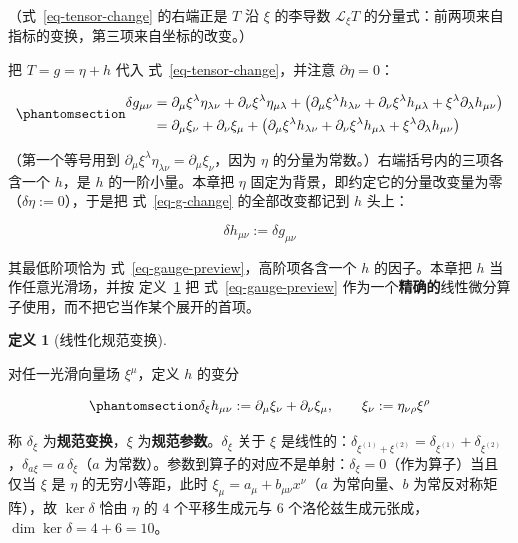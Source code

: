 \documentclass[
  chinese,
  a4paper,
  UTF8,
  12pt,
  oneside,
  openany]{ctexbook}
\theoremstyle{plain}
\theoremstyle{plain}
\theoremstyle{plain}
\theoremstyle{definition}
\newtheorem{definition}{定义}[chapter]
\theoremstyle{plain}
\theoremstyle{plain}
\theoremstyle{remark}
\begin{document}
（式~\ref{eq-tensor-change} 的右端正是 \(T\) 沿 \(\xi\) 的李导数
\(\mathcal{L}_{\xi}T\)
的分量式：前两项来自指标的变换，第三项来自坐标的改变。）

把 \(T=g=\eta+h\) 代入 式~\ref{eq-tensor-change}，并注意
\(\partial\eta=0\)：

\begin{equation}\protect\phantomsection\label{eq-g-change}{
\begin{aligned}
\delta g_{\mu\nu}
&=\partial_{\mu}\xi^{\lambda}\eta_{\lambda\nu}
+\partial_{\nu}\xi^{\lambda}\eta_{\mu\lambda}
+\bigl(\partial_{\mu}\xi^{\lambda}h_{\lambda\nu}
+\partial_{\nu}\xi^{\lambda}h_{\mu\lambda}
+\xi^{\lambda}\partial_{\lambda}h_{\mu\nu}\bigr)\\
&=\partial_{\mu}\xi_{\nu}+\partial_{\nu}\xi_{\mu}
+\bigl(\partial_{\mu}\xi^{\lambda}h_{\lambda\nu}
+\partial_{\nu}\xi^{\lambda}h_{\mu\lambda}
+\xi^{\lambda}\partial_{\lambda}h_{\mu\nu}\bigr)
\end{aligned}
}\end{equation}

（第一个等号用到
\(\partial_{\mu}\xi^{\lambda}\eta_{\lambda\nu}=\partial_{\mu}\xi_{\nu}\)，因为
\(\eta\) 的分量为常数。）右端括号内的三项各含一个 \(h\)，是 \(h\)
的一阶小量。本章把 \(\eta\)
固定为背景，即约定它的分量改变量为零（\(\delta\eta:=0\)），于是把
式~\ref{eq-g-change} 的全部改变都记到 \(h\) 头上：

\[
\delta h_{\mu\nu}:=\delta g_{\mu\nu}
\]

其最低阶项恰为 式~\ref{eq-gauge-preview}，高阶项各含一个 \(h\)
的因子。本章把 \(h\) 当作任意光滑场，并按 定义~\ref{def-linear-gauge} 把
式~\ref{eq-gauge-preview}
作为一个\textbf{精确的}线性微分算子使用，而不把它当作某个展开的首项。

\begin{definition}[线性化规范变换]\protect\hypertarget{def-linear-gauge}{}\label{def-linear-gauge}

对任一光滑向量场 \(\xi^{\mu}\)，定义 \(h\) 的变分

\begin{equation}\protect\phantomsection\label{eq-linear-gauge}{
\delta_{\xi}h_{\mu\nu} := \partial_{\mu}\xi_{\nu}+\partial_{\nu}\xi_{\mu},
\qquad
\xi_{\nu} := \eta_{\nu\rho}\xi^{\rho}
}\end{equation}

称 \(\delta_{\xi}\) 为\textbf{规范变换}，\(\xi\)
为\textbf{规范参数}。\(\delta_{\xi}\) 关于 \(\xi\)
是线性的：\(\delta_{\xi^{(1)}+\xi^{(2)}}=\delta_{\xi^{(1)}}+\delta_{\xi^{(2)}}\)，\(\delta_{a\xi}=a\,\delta_{\xi}\)（\(a\)
为常数）。参数到算子的对应不是单射：\(\delta_{\xi}=0\)（作为算子）当且仅当
\(\xi\) 是 \(\eta\) 的无穷小等距，此时
\(\xi_{\mu}=a_{\mu}+b_{\mu\nu}x^{\nu}\)（\(a\) 为常向量、\(b\)
为常反对称矩阵），故 \(\ker\delta\) 恰由 \(\eta\) 的 \(4\)
个平移生成元与 \(6\) 个洛伦兹生成元张成，\(\dim\ker\delta=4+6=10\)。

\end{definition}
\end{document}
